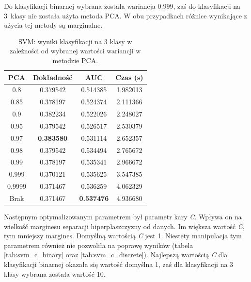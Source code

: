 \documentclass[a4paper, twoside, 11pt, openright]{article}
\begin{document}
Do klasyfikacji binarnej wybrana została wariancja $0.999$, zaś do klasyfikacji na 3~klasy nie została użyta metoda PCA. W obu przypadkach różnice wynikające z użycia tej metody są marginalne.

\begin{table}[H]
    \centering
    \begin{tabular}{|c|c|c|c|}
    \hline
        \textbf{PCA} & \textbf{Dokładność} &  \textbf{AUC} &  \textbf{Czas (s)} \\ \hline
0.8                &  0.379542 &  0.514385 &    1.982013 \\ \hline
0.85               &  0.378197 &  0.524374 &    2.111366 \\ \hline
0.9                &  0.382234 &  0.522026 &    2.248027 \\ \hline
0.95               &  0.379542 &  0.526517 &    2.530379 \\ \hline
0.97               &  \textbf{0.383580} &  0.531114 &    2.652357 \\ \hline
0.98               &  0.379542 &  0.534494 &    2.765672 \\ \hline
0.99               &  0.378197 &  0.535341 &    2.966672 \\ \hline
0.999			   &  0.370121 &  0.535625 &    3.547385 \\ \hline
0.9999             &  0.371467 &  0.536259 &    4.062329 \\ \hline
Brak                &  0.371467 &  \textbf{0.537476} &    4.936680 \\ \hline
    \end{tabular}
    \caption{SVM: wyniki klasyfikacji na 3 klasy w zależności od wybranej wartości wariancji w metodzie PCA.}
    \label{tab:svm_pca_discrete}
\end{table}


Następnym optymalizowanym parametrem był parametr kary \textit{C}. Wpływa on na wielkość marginesu separacji hiperpłaszczyzny od danych. Im większa wartość \textit{C}, tym mniejszy margines. Domyślną wartością \textit{C} jest 1. Niestety manipulacja tym parametrem również nie pozwoliła na poprawę wyników (tabela \ref{tab:svm_c_binary} oraz \ref{tab:svm_c_discrete}). Najlepszą wartością \textit{C} dla klasyfikacji binarnej okazała się wartość domyślna 1, zaś dla klasyfikacji na 3 klasy wybrana została wartość 10. 
\end{document}
